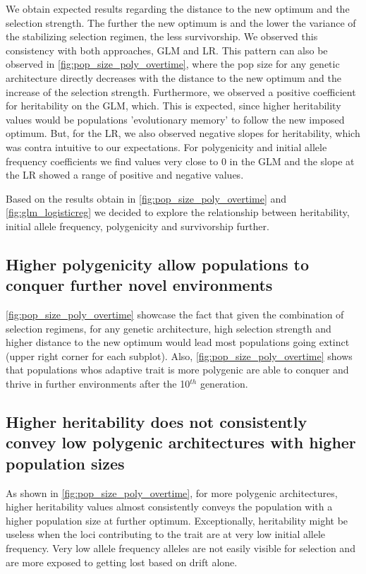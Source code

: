 \documentclass{article}
\begin{document}
We obtain expected results regarding the distance to the new optimum and the selection strength. The further the new optimum is and the lower the variance of the stabilizing selection regimen,  the less survivorship. We observed this consistency with both approaches, GLM and LR. This pattern can also be observed in \ref{fig:pop_size_poly_overtime}, where the pop size for any genetic architecture directly decreases with the distance to the new optimum and the increase of the selection strength. Furthermore, we observed a positive coefficient for heritability on the GLM, which. This is expected, since higher heritability values would be populations 'evolutionary memory' to follow the new imposed optimum. But, for the LR, we also observed negative slopes for heritability, which was contra intuitive to our expectations. For polygenicity and initial allele frequency coefficients we find values very close to 0 in the GLM and the slope at the LR showed a range of positive and negative values. 

Based on the results obtain in \ref{fig:pop_size_poly_overtime} and \ref{fig:glm_logisticreg}  we decided to explore the relationship between heritability, initial allele frequency, polygenicity and survivorship further.

\subsection{Higher polygenicity allow populations to conquer further novel environments}
 \ref{fig:pop_size_poly_overtime} showcase the fact that given the combination of selection regimens, for any genetic architecture, high selection strength and higher distance to the new optimum would lead most populations going extinct (upper right corner for each subplot).
Also, \ref{fig:pop_size_poly_overtime} shows that populations whos adaptive trait is more polygenic are able to conquer  and thrive in further environments after the 10$^{th}$ generation. 

\subsection{Higher heritability does not consistently convey low polygenic architectures with higher population sizes}
As shown in \ref{fig:pop_size_poly_overtime}, for more polygenic architectures, higher heritability values almost consistently conveys the population with a higher population size at further optimum. Exceptionally, heritability might be useless when the loci contributing to the trait are at very low initial allele frequency. Very low allele frequency alleles are not easily visible for selection and are more exposed to getting lost based on drift alone. 
\end{document}
